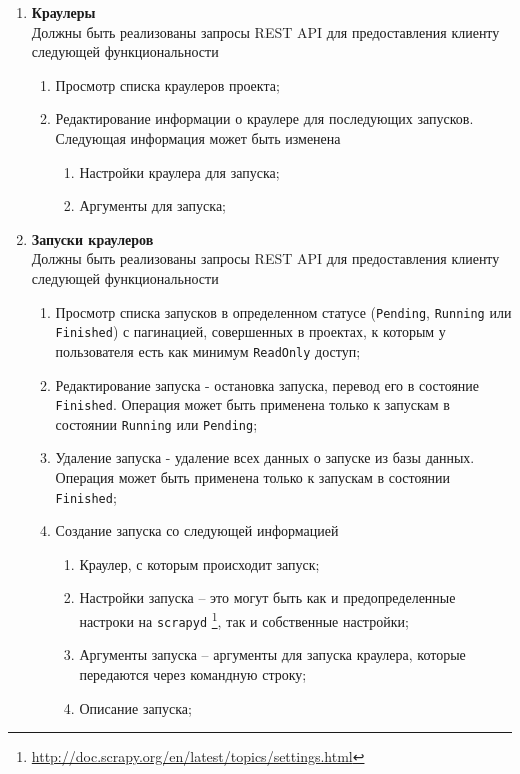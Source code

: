 \begin{enumerate}
		\item \textbf{Краулеры\\}
		Должны быть реализованы запросы REST API для предоставления клиенту следующей функциональности
		\begin{enumerate}
			\item Просмотр списка краулеров проекта;
			\item Редактирование информации о краулере для последующих запусков. Следующая информация может быть изменена
			\begin{enumerate}
			    \item Настройки краулера для запуска;
			    \item Аргументы для запуска;
			\end{enumerate}
		\end{enumerate}
		
		\item \textbf{Запуски краулеров\\}
		Должны быть реализованы запросы REST API для предоставления клиенту следующей функциональности
		\begin{enumerate}
		    \item Просмотр списка запусков в определенном статусе (\texttt{Pending}, \texttt{Running} или \texttt{Finished}) с пагинацией, совершенных в проектах, к которым у пользователя есть как минимум \texttt{ReadOnly} доступ;
		    \item Редактирование запуска - остановка запуска, перевод его в состояние \texttt{Finished}. Операция может быть применена только к запускам в состоянии \texttt{Running} или \texttt{Pending};
		    \item Удаление запуска - удаление всех данных о запуске из базы данных. Операция может быть применена только к запускам в состоянии \texttt{Finished};
		    \item Создание запуска со следующей информацией
		    \begin{enumerate}
		        \item Краулер, с которым происходит запуск;
		        \item Настройки запуска --  это могут быть как и предопределенные настроки на \texttt{scrapyd} \footnote{\url{http://doc.scrapy.org/en/latest/topics/settings.html}}, так и собственные настройки;
		        \item Аргументы запуска -- аргументы для запуска краулера, которые передаются через командную строку;
		        \item Описание запуска;
		    \end{enumerate}
		\end{enumerate}
		

\end{enumerate}
